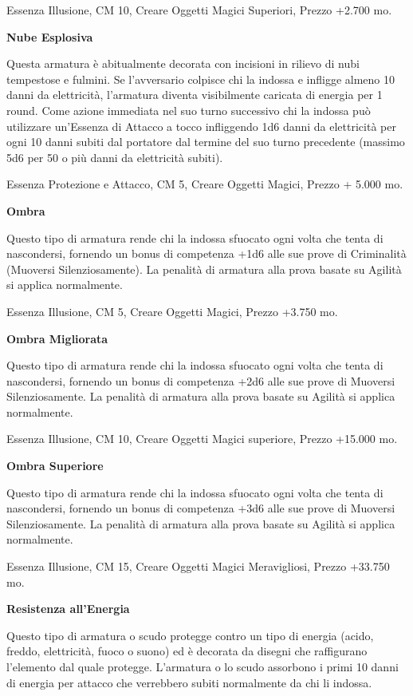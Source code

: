 \documentclass[a4paper,11pt,twoside,openany]{book}
\begin{document}
{Essenza Illusione, CM 10, Creare Oggetti Magici Superiori, Prezzo +2.700 mo.

\textbf{Nube Esplosiva}

Questa armatura è abitualmente decorata con incisioni in rilievo di nubi tempestose e fulmini. Se l'avversario colpisce chi la indossa e infligge almeno 10 danni da elettricità, l'armatura diventa visibilmente caricata di energia per 1 round. Come azione immediata nel suo turno successivo chi la indossa può utilizzare un'Essenza di Attacco a tocco infliggendo 1d6 danni da elettricità per ogni 10 danni subiti dal portatore dal termine del suo turno precedente (massimo 5d6 per 50 o più danni da elettricità subiti).

Essenza Protezione e Attacco, CM 5, Creare Oggetti Magici, Prezzo
+ 5.000 mo.

\textbf{Ombra}

Questo tipo di armatura rende chi la indossa sfuocato ogni volta che tenta di nascondersi, fornendo un bonus di competenza +1d6 alle sue prove di Criminalità (Muoversi Silenziosamente). La penalità di armatura alla prova basate su Agilità si applica normalmente.

Essenza Illusione, CM 5, Creare Oggetti Magici, Prezzo +3.750 mo.

\textbf{Ombra Migliorata}

Questo tipo di armatura rende chi la indossa sfuocato ogni volta che tenta di nascondersi, fornendo un bonus di competenza +2d6 alle sue prove di Muoversi Silenziosamente. La penalità di armatura alla prova basate su Agilità si applica normalmente.

Essenza Illusione, CM 10, Creare Oggetti Magici superiore, Prezzo
+15.000 mo.

\textbf{Ombra Superiore}

Questo tipo di armatura rende chi la indossa sfuocato ogni volta che
tenta di nascondersi, fornendo un bonus di competenza +3d6 alle sue
prove di Muoversi Silenziosamente. La penalità di armatura alla prova
basate su Agilità si applica normalmente.

Essenza Illusione, CM 15, Creare Oggetti Magici Meravigliosi, Prezzo
+33.750 mo.

\textbf{Resistenza all'Energia}

Questo tipo di armatura o scudo protegge contro un tipo di energia (acido, freddo, elettricità, fuoco o suono) ed è decorata da disegni che raffigurano l'elemento dal quale protegge. L'armatura o lo scudo assorbono i primi 10 danni di energia per attacco che verrebbero subiti normalmente da chi li indossa.

}
\end{document}
